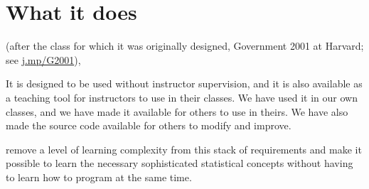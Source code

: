\documentclass[12pt]{article}
\theoremstyle{definition}
\begin{document}
\section{What it does}


(after the class for which it was originally designed, Government 2001 at Harvard; see \href{https://j.mp/G2001}{j.mp/G2001}), 

It is designed to be used without instructor supervision, and it is also available as a teaching tool for instructors to use in their classes.  We have used it in our own classes, and we have made it available for others to use in theirs.  We have also made the source code available for others to modify and improve.



remove a level of learning complexity from this stack of requirements and make it possible to learn the necessary sophisticated statistical concepts without having to learn how to program at the same time.  



\singlespace
\printbibliography
\end{document}
